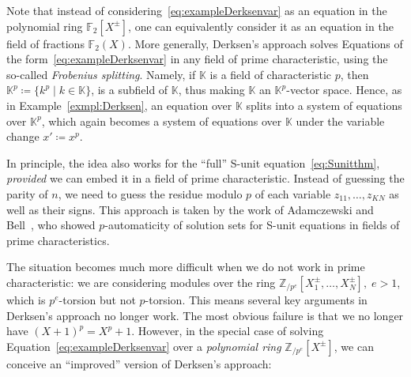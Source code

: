\documentclass[letterpaper, 11pt, thm-restate]{article}
\numberwithin{equation}{section}
\newcommand{\K}{\mathbb{K}}
\newcommand{\F}{\mathbb{F}}
\newcommand{\Zpe}{\mathbb{Z}_{/p^e}}
\theoremstyle{definition}
\theoremstyle{definition}
\theoremstyle{definition}
\begin{document}
Note that instead of considering~\eqref{eq:exampleDerksenvar} as an equation in the polynomial ring $\F_2[X^{\pm}]$, one can equivalently consider it as an equation in the field of fractions $\F_2(X)$.
More generally, Derksen's approach solves Equations of the form~\eqref{eq:exampleDerksenvar} in any field of prime characteristic, using the so-called \emph{Frobenius splitting}.
Namely, if $\K$ is a field of characteristic $p$, then
$
\K^p \coloneqq \{k^p \mid k \in \K\}
$,
is a subfield of $\K$, thus making $\K$ an $\K^p$-vector space.
Hence, as in Example~\ref{exmpl:Derksen}, an equation over $\K$ splits into a system of equations over $\K^p$, which again becomes a system of equations over $\K$ under the variable change $x' \coloneqq x^p$.

In principle, the idea also works for the ``full'' S-unit equation~\eqref{eq:Sunitthm}, \emph{provided} we can embed it in a field of prime characteristic.
Instead of guessing the parity of $n$, we need to guess the residue modulo $p$ of each variable $z_{11}, \ldots, z_{KN}$ as well as their signs.
This approach is taken by the work of Adamczewski and Bell~\cite{adamczewski2012vanishing}, who showed $p$-automaticity of solution sets for S-unit equations in fields of prime characteristics.

The situation becomes much more difficult when we do not work in prime characteristic: we are considering modules over the ring $\Zpe[X_1^{\pm}, \ldots, X_N^{\pm}],\; e > 1$, which is $p^e$-torsion but not $p$-torsion.
This means several key arguments in Derksen's approach no longer work.
The most obvious failure is that we no longer have $(X+1)^p = X^p + 1$. %
However, in the special case of solving Equation~\eqref{eq:exampleDerksenvar} over a \emph{polynomial ring} $\Zpe[X^{\pm}]$, we can conceive an ``improved'' version of Derksen's approach:
\end{document}
